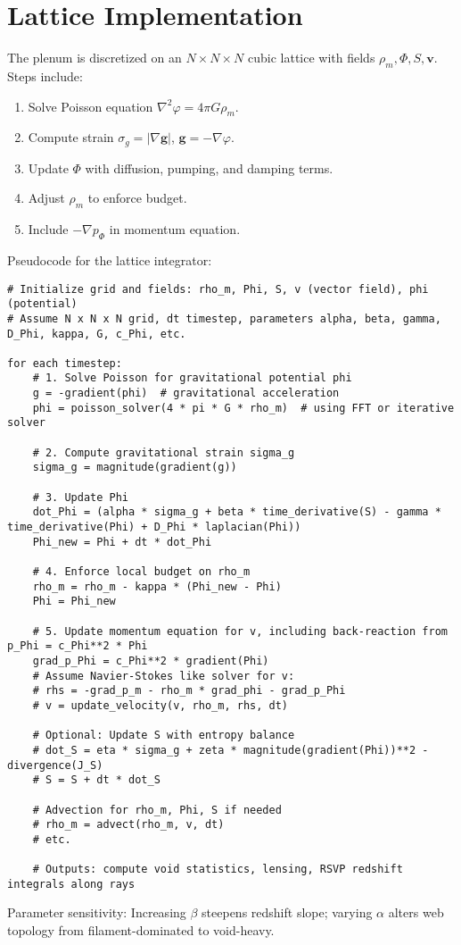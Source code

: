 \documentclass[11pt]{article}
\theoremstyle{plain}
\theoremstyle{definition}
\begin{document}
\section{Lattice Implementation}
The plenum is discretized on an $N \times N \times N$ cubic lattice with fields $\rho_m, \Phi, S, \bm{v}$. Steps include:
\begin{enumerate}
    \item Solve Poisson equation $\nabla^2 \varphi = 4\pi G \rho_m$.
    \item Compute strain $\sigma_g = |\nabla \bm{g}|$, $\bm{g} = -\nabla \varphi$.
    \item Update $\Phi$ with diffusion, pumping, and damping terms.
    \item Adjust $\rho_m$ to enforce budget.
    \item Include $-\nabla p_\Phi$ in momentum equation.
\end{enumerate}
Pseudocode for the lattice integrator:
\begin{verbatim}
# Initialize grid and fields: rho_m, Phi, S, v (vector field), phi (potential)
# Assume N x N x N grid, dt timestep, parameters alpha, beta, gamma, D_Phi, kappa, G, c_Phi, etc.

for each timestep:
    # 1. Solve Poisson for gravitational potential phi
    g = -gradient(phi)  # gravitational acceleration
    phi = poisson_solver(4 * pi * G * rho_m)  # using FFT or iterative solver
    
    # 2. Compute gravitational strain sigma_g
    sigma_g = magnitude(gradient(g))
    
    # 3. Update Phi
    dot_Phi = (alpha * sigma_g + beta * time_derivative(S) - gamma * time_derivative(Phi) + D_Phi * laplacian(Phi))
    Phi_new = Phi + dt * dot_Phi
    
    # 4. Enforce local budget on rho_m
    rho_m = rho_m - kappa * (Phi_new - Phi)
    Phi = Phi_new
    
    # 5. Update momentum equation for v, including back-reaction from p_Phi = c_Phi**2 * Phi
    grad_p_Phi = c_Phi**2 * gradient(Phi)
    # Assume Navier-Stokes like solver for v:
    # rhs = -grad_p_m - rho_m * grad_phi - grad_p_Phi
    # v = update_velocity(v, rho_m, rhs, dt)
    
    # Optional: Update S with entropy balance
    # dot_S = eta * sigma_g + zeta * magnitude(gradient(Phi))**2 - divergence(J_S)
    # S = S + dt * dot_S
    
    # Advection for rho_m, Phi, S if needed
    # rho_m = advect(rho_m, v, dt)
    # etc.
    
    # Outputs: compute void statistics, lensing, RSVP redshift integrals along rays
\end{verbatim}
Parameter sensitivity: Increasing $\beta$ steepens redshift slope; varying $\alpha$ alters web topology from filament-dominated to void-heavy.
\end{document}
